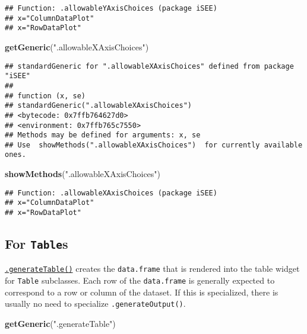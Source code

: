 \documentclass[
]{book}
\newenvironment{Shaded}{\begin{snugshade}}{\end{snugshade}}
\newcommand{\KeywordTok}[1]{\textcolor[rgb]{0.13,0.29,0.53}{\textbf{#1}}}
\newcommand{\NormalTok}[1]{#1}
\newcommand{\StringTok}[1]{\textcolor[rgb]{0.31,0.60,0.02}{#1}}
\begin{document}
\begin{verbatim}
## Function: .allowableYAxisChoices (package iSEE)
## x="ColumnDataPlot"
## x="RowDataPlot"
\end{verbatim}

\begin{Shaded}
\begin{Highlighting}[]
\KeywordTok{getGeneric}\NormalTok{(}\StringTok{".allowableXAxisChoices"}\NormalTok{)}
\end{Highlighting}
\end{Shaded}

\begin{verbatim}
## standardGeneric for ".allowableXAxisChoices" defined from package "iSEE"
## 
## function (x, se) 
## standardGeneric(".allowableXAxisChoices")
## <bytecode: 0x7ffb764627d0>
## <environment: 0x7ffb765c7550>
## Methods may be defined for arguments: x, se
## Use  showMethods(".allowableXAxisChoices")  for currently available ones.
\end{verbatim}

\begin{Shaded}
\begin{Highlighting}[]
\KeywordTok{showMethods}\NormalTok{(}\StringTok{".allowableXAxisChoices"}\NormalTok{)}
\end{Highlighting}
\end{Shaded}

\begin{verbatim}
## Function: .allowableXAxisChoices (package iSEE)
## x="ColumnDataPlot"
## x="RowDataPlot"
\end{verbatim}

\hypertarget{for-tables}{%
\subsection{\texorpdfstring{For \texttt{Table}s}{For Tables}}\label{for-tables}}

\href{https://isee.github.io/iSEE/reference/table-generics.html}{\texttt{.generateTable()}} creates the \texttt{data.frame} that is rendered into the table widget for \texttt{Table} subclasses.
Each row of the \texttt{data.frame} is generally expected to correspond to a row or column of the dataset.
If this is specialized, there is usually no need to specialize \texttt{.generateOutput()}.

\begin{Shaded}
\begin{Highlighting}[]
\KeywordTok{getGeneric}\NormalTok{(}\StringTok{".generateTable"}\NormalTok{)}
\end{Highlighting}
\end{Shaded}
\end{document}
